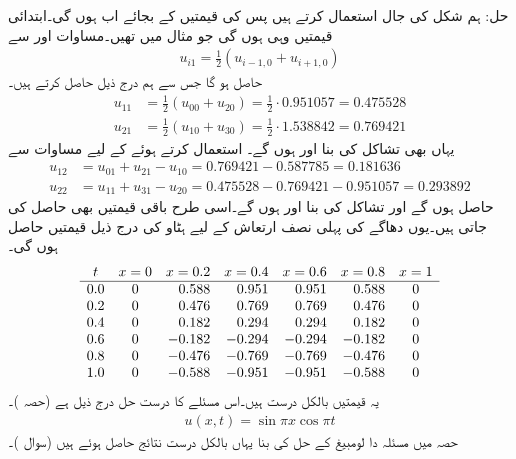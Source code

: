 حل:\quad
ہم شکل  کی جال استعمال کرتے ہیں پس  کی قیمتیں  کے بجائے اب  ہوں گی۔ابتدائی قیمتیں  وہی ہوں گی جو مثال  میں تھیں۔مساوات  اور  سے
\begin{align*}
u_{i1}=\frac{1}{2}(u_{i-1,0}+u_{i+1,0})
\end{align*}
حاصل ہو گا جس سے ہم درج ذیل حاصل کرتے ہیں۔
\begin{align*}
u_{11}&=\frac{1}{2}(u_{00}+u_{20})=\tfrac{1}{2}\cdot \num{0.951057}=\num{0.475528}\\
u_{21}&=\frac{1}{2}(u_{10}+u_{30})=\tfrac{1}{2}\cdot \num{1.538842}=\num{0.769421}
\end{align*}
یہاں بھی تشاکل کی بنا  اور  ہوں گے۔ استعمال کرتے ہوئے  کے لیے مساوات  سے
\begin{align*}
u_{12}&=u_{01}+u_{21}-u_{10}=\num{0.769421}-\num{0.587785}=\num{0.181636}\\
u_{22}&=u_{11}+u_{31}-u_{20}=\num{0.475528}-\num{0.769421}-\num{0.951057}=\num{0.293892}
\end{align*}
حاصل ہوں گے اور تشاکل کی بنا  اور  ہوں گے۔اسی طرح باقی قیمتیں بھی حاصل کی جاتی ہیں۔یوں دھاگے کی پہلی نصف ارتعاش کے لیے ہٹاو  کی درج ذیل قیمتیں حاصل ہوں گی۔
\begin{align*}
\centering
\begin{array}{ccrrrrc}
t&x=0&x=0.2&x=0.4&x=0.6&x=0.8&x=1\\
\hline
0.0&0&0.588&0.951&0.951&0.588&0\\
0.2&0&0.476&0.769&0.769&0.476&0\\
0.4&0&0.182&0.294&0.294&0.182&0\\
0.6&0&-0.182&-0.294&-0.294&-0.182&0\\
0.8&0&-0.476&-0.769&-0.769&-0.476&0\\
1.0&0&-0.588&-0.951&-0.951&-0.588&0
\end{array}
\end{align*}
یہ قیمتیں بالکل درست ہیں۔اس مسئلے کا درست حل درج ذیل ہے (حصہ )۔
\begin{align*}
u(x,t)=\sin\pi x \cos \pi t
\end{align*} 
حصہ  میں مسئلہ دا لومبیغ کے حل کی بنا یہاں بالکل درست نتائج حاصل ہوئے ہیں (سوال )۔

